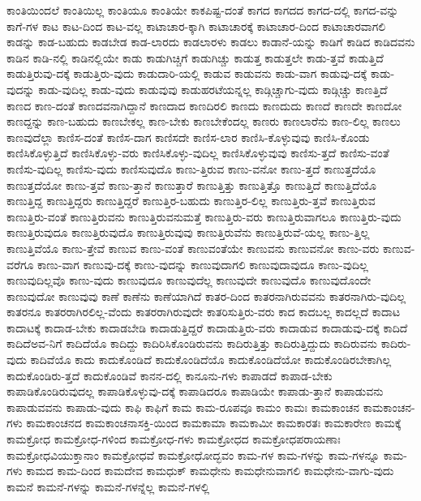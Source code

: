 {ಕಾಂತಿಯಿಂದಲೆ
ಕಾಂತಿಯಿಲ್ಲ
ಕಾಂತಿಯೂ
ಕಾಂತಿಯೇ
ಕಾಕಪಿಷ್ಟ-ದಂತೆ
ಕಾಗದ
ಕಾಗದದ
ಕಾಗದ-ದಲ್ಲಿ
ಕಾಗದ-ವನ್ನು
ಕಾಗೆ-ಗಳ
ಕಾಟ
ಕಾಟ-ದಿಂದ
ಕಾಟ-ವಲ್ಲ
ಕಾಟಾಚಾರ-ಕ್ಕಾಗಿ
ಕಾಟಾಚಾರಕ್ಕೆ
ಕಾಟಾಚಾರ-ದಿಂದ
ಕಾಟಾಚಾರವಾಗಲಿ
ಕಾಡನ್ನು
ಕಾಡ-ಬಹುದು
ಕಾಡಬೇಡ
ಕಾಡ-ಲಾರದು
ಕಾಡಲಾರಳು
ಕಾಡಲು
ಕಾಡಾನೆ-ಯನ್ನು
ಕಾಡಿಗೆ
ಕಾಡಿದ
ಕಾಡಿದವನು
ಕಾಡಿನ
ಕಾಡಿ-ನಲ್ಲಿ
ಕಾಡಿನಲ್ಲಿಯೇ
ಕಾಡು
ಕಾಡುಗಿಚ್ಚಿಗೆ
ಕಾಡುಗಿಚ್ಚು
ಕಾಡುತ್ತ
ಕಾಡುತ್ತಲೇ
ಕಾಡು-ತ್ತವೆ
ಕಾಡುತ್ತಿದೆ
ಕಾಡುತ್ತಿರುವು-ದಕ್ಕೆ
ಕಾಡುತ್ತಿರು-ವುದು
ಕಾಡುದಾರಿ-ಯಲ್ಲಿ
ಕಾಡುವ
ಕಾಡುವನು
ಕಾಡು-ವಾಗ
ಕಾಡುವು-ದಕ್ಕೆ
ಕಾಡು-ವುದನ್ನು
ಕಾಡು-ವುದಿಲ್ಲ
ಕಾಡು-ವುದು
ಕಾಡುವುವು
ಕಾಡುಹರಟೆಯನ್ನಲ್ಲ
ಕಾಡ್ಗಿಚ್ಚಾಗು-ವುದು
ಕಾಡ್ಗಿಚ್ಚು
ಕಾಣತ್ತಿದೆ
ಕಾಣದ
ಕಾಣ-ದಂತೆ
ಕಾಣದವನಾಗಿದ್ದಾನೆ
ಕಾಣದಾದ
ಕಾಣದಿರಲಿ
ಕಾಣದು
ಕಾಣದುದು
ಕಾಣದೆ
ಕಾಣದೇ
ಕಾಣದೋ
ಕಾಣದ್ದನ್ನು
ಕಾಣ-ಬಹುದು
ಕಾಣಬೇಕಲ್ಲ
ಕಾಣ-ಬೇಕು
ಕಾಣಬೇಕೆಂದಲ್ಲ
ಕಾಣರು
ಕಾಣಲಾರೆನು
ಕಾಣ-ಲಿಲ್ಲ
ಕಾಣಲು
ಕಾಣವುದೆಲ್ಲಾ
ಕಾಣಿಸ-ದಂತೆ
ಕಾಣಿಸ-ದಾಗ
ಕಾಣಿಸದೇ
ಕಾಣಿಸ-ಲಾರ
ಕಾಣಿಸಿ-ಕೊಳ್ಳುವುವು
ಕಾಣಿಸಿ-ಕೊಂಡು
ಕಾಣಿಸಿಕೊಳ್ಳುತ್ತಿದೆ
ಕಾಣಿಸಿಕೊಳ್ಳು-ವರು
ಕಾಣಿಸಿಕೊಳ್ಳು-ವುದಿಲ್ಲ
ಕಾಣಿಸಿಕೊಳ್ಳುವುವು
ಕಾಣಿಸು-ತ್ತದೆ
ಕಾಣಿಸು-ವಂತೆ
ಕಾಣಿಸು-ವುದಿಲ್ಲ
ಕಾಣಿಸು-ವುದು
ಕಾಣಿಸುವುದೊ
ಕಾಣು-ತ್ತಿರುವ
ಕಾಣು-ವನೋ
ಕಾಣು-ತ್ತದೆ
ಕಾಣುತ್ತದೆಯೊ
ಕಾಣುತ್ತದೆಯೋ
ಕಾಣು-ತ್ತವೆ
ಕಾಣು-ತ್ತಾನೆ
ಕಾಣುತ್ತಾರೆ
ಕಾಣುತ್ತಿತ್ತು
ಕಾಣುತ್ತಿತ್ತೊ
ಕಾಣುತ್ತಿದೆ
ಕಾಣುತ್ತಿದೆಯೊ
ಕಾಣುತ್ತಿದ್ದ
ಕಾಣುತ್ತಿದ್ದರು
ಕಾಣುತ್ತಿದ್ದರೆ
ಕಾಣುತ್ತಿರ-ಬಹುದು
ಕಾಣುತ್ತಿರ-ಲಿಲ್ಲ
ಕಾಣುತ್ತಿರು-ತ್ತವೆ
ಕಾಣುತ್ತಿರುವ
ಕಾಣುತ್ತಿರು-ವಂತೆ
ಕಾಣುತ್ತಿರುವನು
ಕಾಣುತ್ತಿರುವನುಮತ್ತೆ
ಕಾಣುತ್ತಿರು-ವರು
ಕಾಣುತ್ತಿರುವಾಗಲೂ
ಕಾಣುತ್ತಿರು-ವುದು
ಕಾಣುತ್ತಿರುವುದೂ
ಕಾಣುತ್ತಿರುವುದೊ
ಕಾಣುತ್ತಿರುವುವು
ಕಾಣುತ್ತಿರುವೆನು
ಕಾಣುತ್ತಿರುವೆ-ಯಲ್ಲ
ಕಾಣು-ತ್ತಿಲ್ಲ
ಕಾಣುತ್ತಿವೆಯೊ
ಕಾಣು-ತ್ತೇವೆ
ಕಾಣುವ
ಕಾಣು-ವಂತೆ
ಕಾಣುವಂತೆಯೇ
ಕಾಣುವನು
ಕಾಣುವನೋ
ಕಾಣು-ವರು
ಕಾಣುವ-ವರೆಗೂ
ಕಾಣು-ವಾಗ
ಕಾಣುವು-ದಕ್ಕೆ
ಕಾಣು-ವುದನ್ನು
ಕಾಣುವುದಾಗಲಿ
ಕಾಣುವುದಾವುದೂ
ಕಾಣು-ವುದಿಲ್ಲ
ಕಾಣುವುದಿಲ್ಲವೊ
ಕಾಣು-ವುದು
ಕಾಣುವುದೂ
ಕಾಣುವುದೆಲ್ಲ
ಕಾಣುವುದೇ
ಕಾಣುವುದೊ
ಕಾಣುವುದೊಂದೇ
ಕಾಣುವುದೋ
ಕಾಣುವುವು
ಕಾಣೆ
ಕಾಣೆನು
ಕಾಣೆಯಾಗಿದೆ
ಕಾತರ-ದಿಂದ
ಕಾತರನಾಗಿರುವವನು
ಕಾತರನಾಗಿರು-ವುದಿಲ್ಲ
ಕಾತರನೂ
ಕಾತರರಾಗಿರಲಿಲ್ಲ-ವೆಂದು
ಕಾತರರಾಗಿರುವುದೇ
ಕಾತರಿಸುತ್ತಿರು-ವರು
ಕಾದ
ಕಾದಬಲ್ಲ
ಕಾದಲ್ಲದೆ
ಕಾದಾಟ
ಕಾದಾಟಕ್ಕೆ
ಕಾದಾಡ-ಬೇಕು
ಕಾದಾಡಬೇಡಿ
ಕಾದಾಡುತ್ತಿದ್ದರೆ
ಕಾದಾಡುತ್ತಿರು-ವರು
ಕಾದಾಡುವ
ಕಾದಾಡುವು-ದಕ್ಕೆ
ಕಾದಿದೆ
ಕಾದಿದೆಅವ-ನಿಗೆ
ಕಾದಿದೆಯೊ
ಕಾದಿದ್ದು
ಕಾದಿರಿಸಿಕೊಂಡಿರುವನು
ಕಾದಿರುತ್ತಿತ್ತು
ಕಾದಿರುತ್ತಿದ್ದುದು
ಕಾದಿರುವನು
ಕಾದಿರು-ವುದು
ಕಾದಿವೆಯೊ
ಕಾದು
ಕಾದುಕೊಂಡಿದೆ
ಕಾದುಕೊಂಡಿದೆಯೊ
ಕಾದುಕೊಂಡಿದೆಯೋ
ಕಾದುಕೊಂಡಿರಬೇಕಾಗಿಲ್ಲ
ಕಾದುಕೊಂಡಿರು-ತ್ತದೆ
ಕಾದುಕೊಂಡಿವೆ
ಕಾನನ-ದಲ್ಲಿ
ಕಾನೂನು-ಗಳು
ಕಾಪಾಡದೆ
ಕಾಪಾಡ-ಬೇಕು
ಕಾಪಾಡಿಕೊಂಡಿರುವುದಲ್ಲ
ಕಾಪಾಡಿಕೊಳ್ಳುವು-ದಕ್ಕೆ
ಕಾಪಾಡಿದರೂ
ಕಾಪಾಡಿಯೇ
ಕಾಪಾಡು-ತ್ತಾನೆ
ಕಾಪಾಡುವನು
ಕಾಪಾಡುವವನು
ಕಾಪಾಡು-ವುದು
ಕಾಫಿ
ಕಾಫಿಗೆ
ಕಾಮ
ಕಾಮ-ರೂಪವೂ
ಕಾಮಂ
ಕಾಮಃ
ಕಾಮಕಾಂಚನ
ಕಾಮಕಾಂಚನ-ಗಳು
ಕಾಮಕಾಂಚನದ
ಕಾಮಕಾಂಚನಾಸಕ್ತಿ-ಯಿಂದ
ಕಾಮಕಾಮಾ
ಕಾಮಕಾಮೀ
ಕಾಮಕಾರತಃ
ಕಾಮಕಾರೇಣ
ಕಾಮಕ್ಕೆ
ಕಾಮಕ್ರೋಧ
ಕಾಮಕ್ರೋಧ-ಗಳಿಂದ
ಕಾಮಕ್ರೋಧ-ಗಳು
ಕಾಮಕ್ರೋಧದ
ಕಾಮಕ್ರೋಧಪರಾಯಣಾಃ
ಕಾಮಕ್ರೋಧವಿಯುಕ್ತಾನಾಂ
ಕಾಮಕ್ರೋಧವೆ
ಕಾಮಕ್ರೋಧೋದ್ಭವಂ
ಕಾಮ-ಗಳ
ಕಾಮ-ಗಳನ್ನು
ಕಾಮ-ಗಳನ್ನೂ
ಕಾಮ-ಗಳು
ಕಾಮದ
ಕಾಮ-ದಿಂದ
ಕಾಮದೇವ
ಕಾಮಧುಕ್
ಕಾಮಧೇನು
ಕಾಮಧೇನುವಾಗಲಿ
ಕಾಮಧೇನು-ವಾಗು-ವುದು
ಕಾಮನೆ
ಕಾಮನೆ-ಗಳನ್ನು
ಕಾಮನೆ-ಗಳನ್ನೆಲ್ಲ
ಕಾಮನೆ-ಗಳಲ್ಲಿ
}

